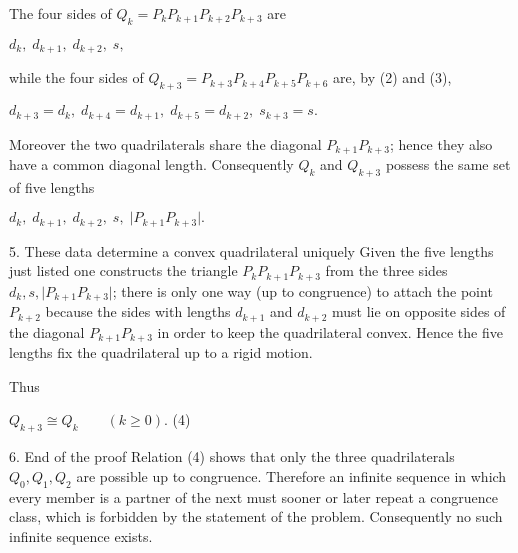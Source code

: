    The four sides of \(Q_k=P _kP _{k+1}P _{k+2}P _{k+3}\) are  

            \(d_k,\;d_{k+1},\;d_{k+2},\;s,\)

   while the four sides of \(Q_{k+3}=P _{k+3}P _{k+4}P _{k+5}P _{k+6}\)
   are, by (2) and (3),

            \(d_{k+3}=d_k,\;d_{k+4}=d_{k+1},\;
             d_{k+5}=d_{k+2},\;s_{k+3}=s.\)

   Moreover the two quadrilaterals share the diagonal  
   \(P _{k+1}P _{k+3}\); hence they also have a common diagonal length.
   Consequently \(Q_{k}\) and \(Q_{k+3}\) possess the same
   set of five lengths

            \(d_k,\;d_{k+1},\;d_{k+2},\;s,\;\lvert P _{k+1}P _{k+3}\rvert .\)

5.  These data determine a convex quadrilateral uniquely  
   Given the five lengths just listed one constructs the triangle
   \(P _kP _{k+1}P _{k+3}\) from the three sides
   \(d_k,s,\lvert P _{k+1}P _{k+3}\rvert\);   
   there is only one way (up to congruence) to attach the point
   \(P _{k+2}\) because
   the sides with lengths \(d_{k+1}\) and \(d_{k+2}\) must lie on
   opposite sides of the diagonal \(P _{k+1}P _{k+3}\) in order to keep
   the quadrilateral convex.
   Hence the five lengths fix the quadrilateral up to a rigid motion.

   Thus  

            \(Q_{k+3}\cong Q_k\qquad(k\ge 0).\)                        (4)

6.  End of the proof  
   Relation (4) shows that only the three quadrilaterals
   \(Q_0, Q_1, Q_2\) are possible up to congruence.
   Therefore an infinite sequence in which every member is a partner
   of the next must sooner or later repeat a congruence class,
   which is forbidden by the statement of the problem.  
   Consequently no such infinite sequence exists.